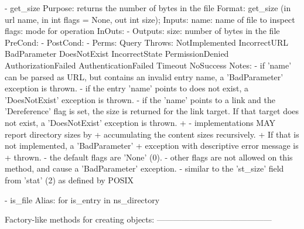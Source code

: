 \begin{myspec}
    - get_size
      Purpose:  returns the number of bytes in the file
      Format:   get_size           (in  url       name,
                                    in  int       flags = None,
                                    out int       size);
      Inputs:   name:               name of file to inspect
                flags:              mode for operation
      InOuts:   -
      Outputs:  size:               number of bytes in the file
      PreCond:  -
      PostCond: - 
      Perms:    Query
      Throws:   NotImplemented
                IncorrectURL
                BadParameter
                DoesNotExist
                IncorrectState
                PermissionDenied
                AuthorizationFailed
                AuthenticationFailed
                Timeout
                NoSuccess
      Notes:    - if 'name' can be parsed as URL, but contains 
                  an invalid entry name, a 'BadParameter'
                  exception is thrown.
                - if the entry 'name' points to does not exist, 
                  a 'DoesNotExist' exception is thrown.
                - if the 'name' points to a link and the 
                  'Dereference' flag is set, the size is 
                  returned for the link target.  If that target 
                  does not exist, a 'DoesNotExist' exception is 
                  thrown.
+               - implementations MAY report directory sizes by
+                 accumulating the content sizes recursively.  
+                 If that is not implemented, a 'BadParameter' 
+                 exception with descriptive error message is 
+                 thrown.
                - the default flags are 'None' (0).
                - other flags are not allowed on this method, 
                  and cause a 'BadParameter' exception.
                - similar to the 'st_size' field from 'stat' (2)
                  as defined by POSIX
 
    - is_file
      Alias:    for is_entry in ns_directory
 
 
    Factory-like methods for creating objects:
    ------------------------------------------
 

\end{myspec}

